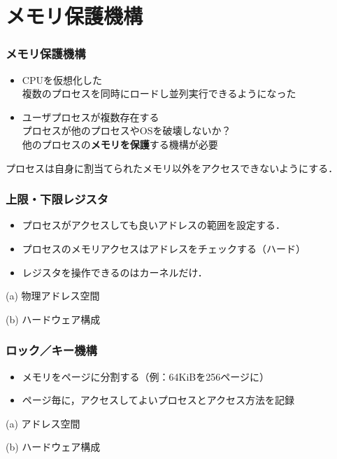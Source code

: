 \documentclass[unicode,handout]{beamer}                   %
\begin{document}
\section{メモリ保護機構}
\begin{frame}
  \frametitle{メモリ保護機構}
  \begin{itemize}
    \item CPUを仮想化した\\
      複数のプロセスを同時にロードし並列実行できるようになった
    \item ユーザプロセスが複数存在する \\
      プロセスが他のプロセスやOSを破壊しないか？\\
      他のプロセスの{\bf メモリを保護}する機構が必要
  \end{itemize}
  プロセスは自身に割当てられたメモリ以外をアクセスできないようにする．
\end{frame}

\begin{frame}
  \frametitle{上限・下限レジスタ}
  \begin{itemize}
    \item プロセスがアクセスしても良いアドレスの範囲を設定する．
    \item プロセスのメモリアクセスはアドレスをチェックする（ハード）
    \item レジスタを操作できるのはカーネルだけ．
  \end{itemize}
  \begin{minipage}{0.49\columnwidth}
    \centerline{(a) 物理アドレス空間}
  \end{minipage}
  \begin{minipage}{0.49\columnwidth}
    \centerline{(b) ハードウェア構成}
  \end{minipage}
  \vfill
\end{frame}

\begin{frame}
  \frametitle{ロック／キー機構}
  \begin{itemize}
    \item メモリをページに分割する（例：64KiBを256ページに）
    \item ページ毎に，アクセスしてよいプロセスとアクセス方法を記録
  \end{itemize}
  \begin{minipage}{0.49\columnwidth}
    \centerline{(a) アドレス空間}
  \end{minipage}
  \begin{minipage}{0.49\columnwidth}
    \centerline{(b) ハードウェア構成}
  \end{minipage}
  \vfill
\end{frame}
\end{document}
